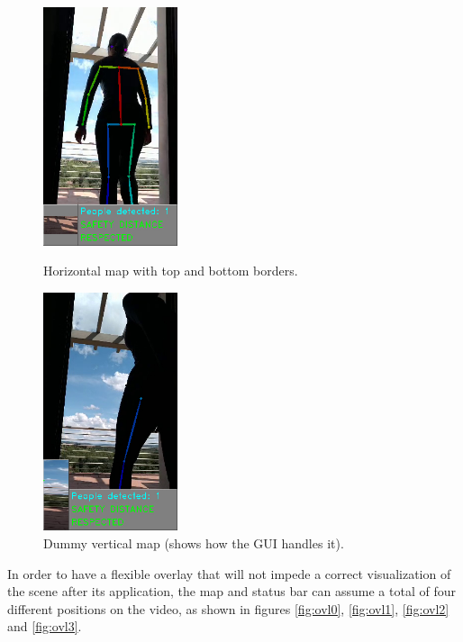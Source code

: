 \documentclass[12pt]{article}
\begin{document}
\begin{figure}[H]
  \centering
  \begin{minipage}[b]{0.45\textwidth}
    \centering
    \includegraphics[height=7cm,keepaspectratio]{img/horizontal_map.jpg}
    \caption{Horizontal map with top and bottom borders.}
    \label{fig:hormap}
  \end{minipage}
  \hfill
  \begin{minipage}[b]{0.45\textwidth}
    \centering
    \includegraphics[height=7cm,keepaspectratio]{img/vertical_map.jpg}
    \caption{Dummy vertical map (shows how the GUI handles it).}
    \label{fig:vermap}
  \end{minipage}
\end{figure}

In order to have a flexible overlay that will not impede a correct visualization of the scene after its application, the map and status bar can assume a total of four different positions on the video, as shown in figures \ref{fig:ovl0}, \ref{fig:ovl1}, \ref{fig:ovl2} and \ref{fig:ovl3}.
\end{document}
